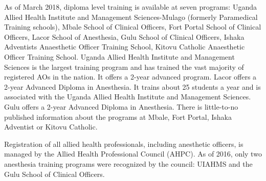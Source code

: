 \documentclass[12pt]{article} %
\begin{document}
As of March 2018, diploma level training is available at seven programs: Uganda Allied Health Institute and Management Sciences-Mulago (formerly Paramedical Training
schools), Mbale School of Clinical Officers, Fort Portal School of Clinical Officers, Lacor School of Anesthesia, Gulu School of Clinical Officers,  Ishaka Adventists Anaesthetic Officer Training School, Kitovu Catholic Anaesthetic Officer Training School. 
\citet{mohscholar2017}
Uganda Allied Health Institute and Management Sciences is the largest training program and has trained the vast majority of registered AOs in the nation. It offers a 2-year advanced program. 
\citet{mugalopara2013}
Lacor offers a 2-year Advanced Diploma in Anesthesia. It trains about 25 students a year and is associated with the Uganda Allied Health Institute and Management Sciences.
\citet{lacoranes2018}
Gulu offers a 2-year Advanced Diploma in Anesthesia.
There is little-to-no published information about the programs at Mbale, Fort Portal, Ishaka Adventist or Kitovu Catholic.

Registration of all allied health professionals, including anesthetic officers, is managed by the Allied Health Professional Council (AHPC). As of 2016, only two anesthesia training programs were recognized by the council: UIAHMS and the Gulu School of Clinical Officers. 
\end{document}
